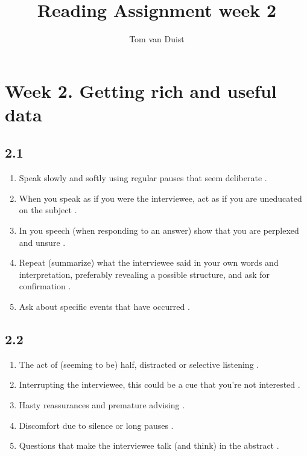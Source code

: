 

\title{Reading Assignment week 2}
\newcommand{\TitelAbbr}{}
\newcommand{\Version}{0.1}



\what{}
\supervisors{}
\author{Tom van Duist}




\maketitle

\clearpage

\chapter*{Week 2. Getting rich and useful data}

\section*{2.1}

\begin{enumerate}
	\item Speak slowly and softly using regular pauses that seem deliberate \cite{medical}.
	\item When you speak as if you were the interviewee, act as if you are uneducated on the subject \cite{medical}.
	\item In you speech (when responding to an answer) show that you are perplexed and unsure \cite{medical}.
	\item Repeat (summarize) what the interviewee said in your own words and interpretation, preferably revealing a possible structure, and ask for confirmation \cite{apprenticing}.
	\item Ask about specific events that have occurred \cite{apprenticing}.
\end{enumerate}

\section*{2.2}

\begin{enumerate}
	\item The act of (seeming to be) half, distracted or selective listening \cite{medical}.
	\item Interrupting the interviewee, this could be a cue that you're not interested \cite{medical}.
	\item Hasty reassurances and premature advising \cite{medical}. 
	\item Discomfort due to silence or long pauses \cite{medical}.
	\item Questions that make the interviewee talk (and think) in the abstract \cite{apprenticing}.
\end{enumerate}

